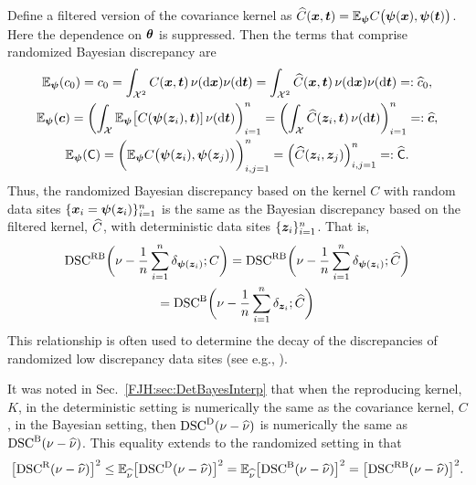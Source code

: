 \documentclass[graybox,footinfo]{svmult}
\begin{document}
Define a filtered version of the covariance kernel as $\widehat{C}({\boldsymbol{x}},{\boldsymbol{t}}) = {\mathbb{E}}_{{\boldsymbol{\psi}}} 
C\bigl({\boldsymbol{\psi}}({\boldsymbol{x}}), {\boldsymbol{\psi}}({\boldsymbol{t}}) \bigr)$.  Here the dependence on ${\boldsymbol{\theta}}$ is 
suppressed.  Then the terms that comprise randomized 
Bayesian discrepancy are
	\begin{gather*}
	 {\mathbb{E}}_{{\boldsymbol{\psi}}}(c_0)  = c_0 =  \int_{{\mathcal{X}}^2} C({\boldsymbol{x}},{\boldsymbol{t}}) \, \nu(\mathrm{d} {\boldsymbol{x}}) \nu(\mathrm{d} 
	 {\boldsymbol{t}}) = 
	 \int_{{\mathcal{X}}^2} \widehat{C}({\boldsymbol{x}},{\boldsymbol{t}}) \, \nu(\mathrm{d} {\boldsymbol{x}}) \nu(\mathrm{d} {\boldsymbol{t}}) =: \widehat{c}_0, \\
	 {\mathbb{E}}_{{\boldsymbol{\psi}}}({\boldsymbol{c}}) = 
	\biggl( \int_{{\mathcal{X}}} 
	{\mathbb{E}}_{{\boldsymbol{\psi}}}\bigl[C({\boldsymbol{\psi}}({\boldsymbol{z}}_i),{\boldsymbol{t}})] \,\nu(\mathrm{d} {\boldsymbol{t}}) \biggr)_{i=1}^n = 
	\biggl( \int_{{\mathcal{X}}} 
	\widehat{C}({\boldsymbol{z}}_i,{\boldsymbol{t}}) \,\nu(\mathrm{d} {\boldsymbol{t}}) \biggr)_{i=1}^n = : \widehat{{\boldsymbol{c}}}, \\
	 {\mathbb{E}}_{{\boldsymbol{\psi}}}(\mathsf{C})  = \biggl(  {\mathbb{E}}_{{\boldsymbol{\psi}}} 
	 C\bigl({\boldsymbol{\psi}}({\boldsymbol{z}}_i), {\boldsymbol{\psi}}({\boldsymbol{z}}_j) \bigr) \biggr)_{i,j=1}^n = \Bigl( \widehat{C}({\boldsymbol{z}}_i,{\boldsymbol{z}}_j) 
	 \Bigr)_{i,j=1}^n =: \widehat{\mathsf{C}}.
	\end{gather*}
Thus, the randomized Bayesian discrepancy based on the kernel $C$ with random data 
sites $\{{\boldsymbol{x}}_i = {\boldsymbol{\psi}}({\boldsymbol{z}}_i)\}_{i=1}^n$ is the same as the Bayesian discrepancy based 
on the filtered kernel, $\widehat{C}$, with deterministic data sites $\{{\boldsymbol{z}}_i\}_{i=1}^n$.  That is, 
\begin{multline}
\textup{DSC}^{\textup{R}\textup{B}}\biggl(\nu - \frac 1n \sum_{i=1}^n \delta_{{\boldsymbol{\psi}}({\boldsymbol{z}}_i)} ; C\biggr) = 
\textup{DSC}^{\textup{R}\textup{B}}\biggl(\nu - \frac 1n \sum_{i=1}^n \delta_{{\boldsymbol{\psi}}({\boldsymbol{z}}_i)} ; \widehat{C}\biggr) \\
=
\textup{DSC}^{\textup{B}}\biggl(\nu - 
\frac 1n \sum_{i=1}^n \delta_{{\boldsymbol{z}}_i} ; \widehat{C} \biggr)
\end{multline}
This relationship is often used to determine the decay of the discrepancies of 
randomized low 
discrepancy data sites (see e.g., \cite{HicWoz00a, HicYue00}).

It was noted in Sec.\ \ref{FJH:sec:DetBayesInterp} that when the reproducing kernel, 
$K$, in the deterministic setting is numerically the same as the covariance kernel, $C$, 
in the Bayesian setting, then $\textup{DSC}^{\textup{D}}(\nu - \widehat{\nu})$ is numerically the same as 
$\textup{DSC}^{\textup{B}}(\nu - \widehat{\nu})$.  This equality extends to the randomized setting in that 
\begin{equation*}
\bigl[\textup{DSC}^{\textup{R}}(\nu - \widehat{\nu})\bigr]^2 \le {\mathbb{E}}_{\widehat{\nu}} \bigl[\textup{DSC}^{\textup{D}}(\nu - \widehat{\nu})\bigr]^2 = 
{\mathbb{E}}_{\widehat{\nu}} \bigl[\textup{DSC}^{\textup{B}}(\nu - 
\widehat{\nu})\bigr]^2 = \bigl[\textup{DSC}^{\textup{R}\textup{B}}(\nu - \widehat{\nu})\bigr]^2.
\end{equation*}
\end{document}
